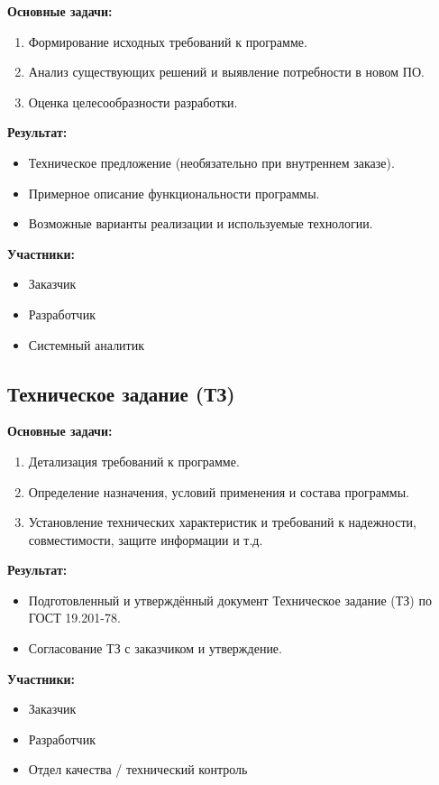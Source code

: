 \textbf{Основные задачи:}
\begin{enumerate}
    \item Формирование исходных требований к программе.
    \item Анализ существующих решений и выявление потребности в новом ПО.
    \item Оценка целесообразности разработки.
\end{enumerate}

\textbf{Результат:}
\begin{itemize}
    \item Техническое предложение (необязательно при внутреннем заказе).
    \item Примерное описание функциональности программы.
    \item Возможные варианты реализации и используемые технологии.
\end{itemize}

\textbf{Участники:}
\begin{itemize}
    \item Заказчик
    \item Разработчик
    \item Системный аналитик
\end{itemize}

\subsection{Техническое задание (ТЗ)}

\textbf{Основные задачи:}
\begin{enumerate}
    \item Детализация требований к программе.
    \item Определение назначения, условий применения и состава программы.
    \item Установление технических характеристик и требований к надежности, совместимости, защите информации и т.д.
\end{enumerate}

\textbf{Результат:}
\begin{itemize}
    \item Подготовленный и утверждённый документ Техническое задание (ТЗ) по ГОСТ 19.201-78.
    \item Согласование ТЗ с заказчиком и утверждение.
\end{itemize}

\textbf{Участники:}
\begin{itemize}
    \item Заказчик
    \item Разработчик
    \item Отдел качества / технический контроль
\end{itemize}

